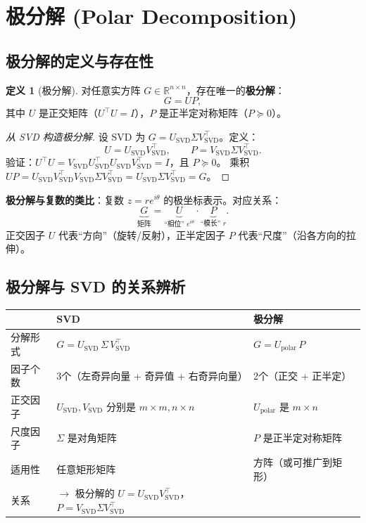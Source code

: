 \documentclass[12pt,a4paper]{ctexart}
\theoremstyle{definition}
\newtheorem{definition}{定义}[section]
\theoremstyle{plain}
\newcommand{\R}{\mathbb{R}}
\begin{document}
\section{极分解 (Polar Decomposition)}

\subsection{极分解的定义与存在性}

\begin{definition}[极分解]
  对任意实方阵 $G\in\R^{n\times n}$，存在唯一的\textbf{极分解}：
  \begin{equation}\label{eq:polar}
    G = U P,
  \end{equation}
  其中 $U$ 是正交矩阵（$U^\top U=I$），$P$ 是正半定对称矩阵（$P\succeq0$）。
\end{definition}

\begin{proof}[从 SVD 构造极分解]
  设 SVD 为 $G=U_{\text{SVD}}\Sigma V_{\text{SVD}}^\top$。定义：
  \[
    U = U_{\text{SVD}} V_{\text{SVD}}^\top,\qquad
    P = V_{\text{SVD}} \Sigma V_{\text{SVD}}^\top.
  \]
  验证：$U^\top U = V_{\text{SVD}}U_{\text{SVD}}^\top U_{\text{SVD}}V_{\text{SVD}}^\top = I$，且 $P\succeq0$。
  乘积 $UP = U_{\text{SVD}}V_{\text{SVD}}^\top V_{\text{SVD}}\Sigma V_{\text{SVD}}^\top = U_{\text{SVD}}\Sigma V_{\text{SVD}}^\top = G$。
\end{proof}

\textbf{极分解与复数的类比}：复数 $z=re^{i\theta}$ 的极坐标表示。对应关系：
\[
  \underbrace{G}_{\text{矩阵}} = \underbrace{U}_{\text{“相位” }e^{i\theta}} \cdot \underbrace{P}_{\text{“模长” }r}.
\]
正交因子 $U$ 代表``方向''（旋转/反射），正半定因子 $P$ 代表``尺度''（沿各方向的拉伸）。

\subsection{极分解与 SVD 的关系辨析}

\begin{center}
\begin{tabular}{p{2.5cm}p{4.5cm}p{4.5cm}}
\toprule
 & \textbf{SVD} & \textbf{极分解} \\
\midrule
分解形式 & $G = U_{\text{SVD}}\,\Sigma\, V_{\text{SVD}}^\top$ & $G = U_{\text{polar}}\, P$ \\
因子个数 & 3个（左奇异向量 + 奇异值 + 右奇异向量） & 2个（正交 + 正半定） \\
正交因子 & $U_{\text{SVD}},V_{\text{SVD}}$ 分别是 $m\times m,n\times n$ & $U_{\text{polar}}$ 是 $m\times n$ \\
尺度因子 & $\Sigma$ 是对角矩阵 & $P$ 是正半定对称矩阵 \\
适用性 & 任意矩形矩阵 & 方阵（或可推广到矩形） \\
关系 & $\to$ 极分解的 $U=U_{\text{SVD}}V_{\text{SVD}}^\top$，$P=V_{\text{SVD}}\Sigma V_{\text{SVD}}^\top$ \\
\bottomrule
\end{tabular}
\end{center}
\end{document}
